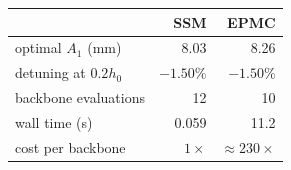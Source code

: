 \begin{tabular}{@{}lrr@{}}
\toprule
 & SSM & EPMC\\ \midrule
optimal $A_1$ (mm) & 8.03 & 8.26\\
detuning at $0.2h_0$ & $-1.50\%$ & $-1.50\%$\\
backbone evaluations & 12 & 10\\
wall time (s) & 0.059 & 11.2\\
cost per backbone & $1\times$ & $\approx230\times$\\
\bottomrule
\end{tabular}
